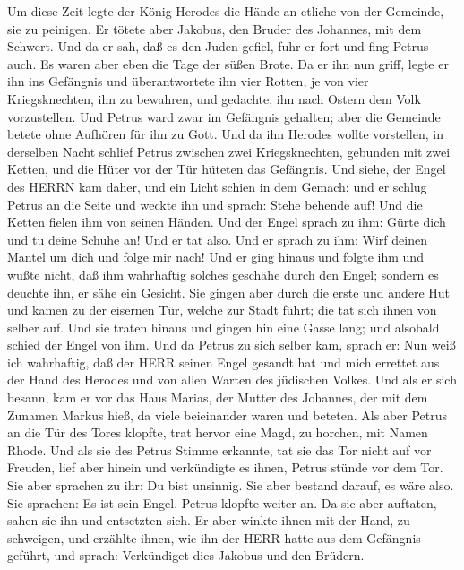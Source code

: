  Um diese Zeit legte der König Herodes die Hände an etliche
von der Gemeinde, sie zu peinigen.  Er tötete aber Jakobus,
den Bruder des Johannes, mit dem Schwert.  Und da er sah,
daß es den Juden gefiel, fuhr er fort und fing Petrus auch. Es waren
aber eben die Tage der süßen Brote.  Da er ihn nun griff,
legte er ihn ins Gefängnis und überantwortete ihn vier Rotten, je von
vier Kriegsknechten, ihn zu bewahren, und gedachte, ihn nach Ostern dem
Volk vorzustellen.  Und Petrus ward zwar im Gefängnis
gehalten; aber die Gemeinde betete ohne Aufhören für ihn zu Gott.
 Und da ihn Herodes wollte vorstellen, in derselben Nacht
schlief Petrus zwischen zwei Kriegsknechten, gebunden mit zwei Ketten,
und die Hüter vor der Tür hüteten das Gefängnis.  Und siehe,
der Engel des HERRN kam daher, und ein Licht schien in dem Gemach; und
er schlug Petrus an die Seite und weckte ihn und sprach: Stehe behende
auf! Und die Ketten fielen ihm von seinen Händen.  Und der
Engel sprach zu ihm: Gürte dich und tu deine Schuhe an! Und er tat also.
Und er sprach zu ihm: Wirf deinen Mantel um dich und folge mir nach!
 Und er ging hinaus und folgte ihm und wußte nicht, daß ihm
wahrhaftig solches geschähe durch den Engel; sondern es deuchte ihn, er
sähe ein Gesicht.  Sie gingen aber durch die erste und
andere Hut und kamen zu der eisernen Tür, welche zur Stadt führt; die
tat sich ihnen von selber auf. Und sie traten hinaus und gingen hin eine
Gasse lang; und alsobald schied der Engel von ihm.  Und da
Petrus zu sich selber kam, sprach er: Nun weiß ich wahrhaftig, daß der
HERR seinen Engel gesandt hat und mich errettet aus der Hand des Herodes
und von allen Warten des jüdischen Volkes.  Und als er sich
besann, kam er vor das Haus Marias, der Mutter des Johannes, der mit dem
Zunamen Markus hieß, da viele beieinander waren und beteten.
 Als aber Petrus an die Tür des Tores klopfte, trat hervor
eine Magd, zu horchen, mit Namen Rhode.  Und als sie des
Petrus Stimme erkannte, tat sie das Tor nicht auf vor Freuden, lief aber
hinein und verkündigte es ihnen, Petrus stünde vor dem Tor.
 Sie aber sprachen zu ihr: Du bist unsinnig. Sie aber
bestand darauf, es wäre also. Sie sprachen: Es ist sein Engel.
 Petrus klopfte weiter an. Da sie aber auftaten, sahen sie
ihn und entsetzten sich.  Er aber winkte ihnen mit der
Hand, zu schweigen, und erzählte ihnen, wie ihn der HERR hatte aus dem
Gefängnis geführt, und sprach: Verkündiget dies Jakobus und den Brüdern.
